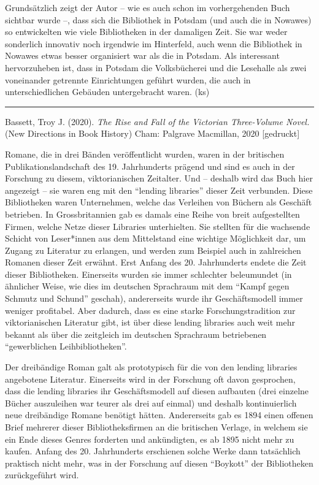 \documentclass[a4paper,
fontsize=11pt,
oneside,
numbers=noperiodatend,
parskip=half-,
bibliography=totoc,
final
]{scrartcl}
\begin{document}
Grundsätzlich zeigt der Autor -- wie es auch schon im vorhergehenden
Buch sichtbar wurde --, dass sich die Bibliothek in Potsdam (und auch
die in Nowawes) so entwickelten wie viele Bibliotheken in der damaligen
Zeit. Sie war weder sonderlich innovativ noch irgendwie im Hinterfeld,
auch wenn die Bibliothek in Nowawes etwas besser organisiert war als die
in Potsdam. Als interessant hervorzuheben ist, dass in Potsdam die
Volksbücherei und die Lesehalle als zwei voneinander getrennte
Einrichtungen geführt wurden, die auch in unterschiedlichen Gebäuden
untergebracht waren. (ks)

\begin{center}\rule{0.5\linewidth}{0.5pt}\end{center}

Bassett, Troy J. (2020). \emph{The Rise and Fall of the Victorian
Three-Volume Novel.} (New Directions in Book History) Cham: Palgrave
Macmillan, 2020 {[}gedruckt{]}

Romane, die in drei Bänden veröffentlicht wurden, waren in der
britischen Publikationslandschaft des 19. Jahrhunderts prägend und sind
es auch in der Forschung zu diesem, viktorianischen Zeitalter. Und --
deshalb wird das Buch hier angezeigt -- sie waren eng mit den
\enquote{lending libraries} dieser Zeit verbunden. Diese Bibliotheken
waren Unternehmen, welche das Verleihen von Büchern als Geschäft
betrieben. In Grossbritannien gab es damals eine Reihe von breit
aufgestellten Firmen, welche Netze dieser Libraries unterhielten. Sie
stellten für die wachsende Schicht von Leser*innen aus dem Mittelstand
eine wichtige Möglichkeit dar, um Zugang zu Literatur zu erlangen, und
werden zum Beispiel auch in zahlreichen Romanen dieser Zeit erwähnt.
Erst Anfang des 20. Jahrhunderts endete die Zeit dieser Bibliotheken.
Einerseits wurden sie immer schlechter beleumundet (in ähnlicher Weise,
wie dies im deutschen Sprachraum mit dem \enquote{Kampf gegen Schmutz
und Schund} geschah), andererseits wurde ihr Geschäftsmodell immer
weniger profitabel. Aber dadurch, dass es eine starke
Forschungstradition zur viktorianischen Literatur gibt, ist über diese
lending libraries auch weit mehr bekannt als über die zeitgleich im
deutschen Sprachraum betriebenen \enquote{gewerblichen
Leihbibliotheken}.

Der dreibändige Roman galt als prototypisch für die von den lending
libraries angebotene Literatur. Einerseits wird in der Forschung oft
davon gesprochen, dass die lending libraries ihr Geschäftsmodell auf
diesen aufbauten (drei einzelne Bücher auszuleihen war teurer als drei
auf einmal) und deshalb kontinuierlich neue dreibändige Romane benötigt
hätten. Andererseits gab es 1894 einen offenen Brief mehrerer dieser
Bibliotheksfirmen an die britischen Verlage, in welchem sie ein Ende
dieses Genres forderten und ankündigten, es ab 1895 nicht mehr zu
kaufen. Anfang des 20. Jahrhunderts erschienen solche Werke dann
tatsächlich praktisch nicht mehr, was in der Forschung auf diesen
\enquote{Boykott} der Bibliotheken zurückgeführt wird.
\end{document}
